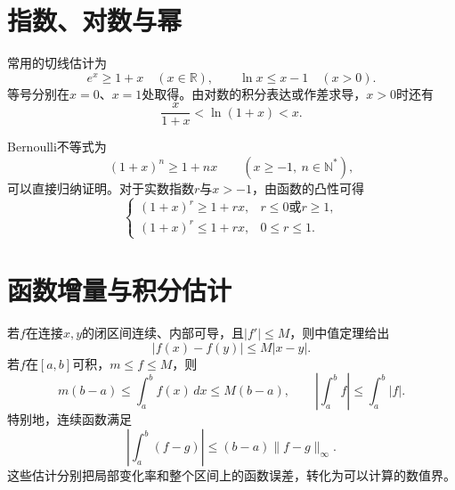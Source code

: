 \section{指数、对数与幂}

常用的切线估计为
\begin{equation*}
 e^x\ge1+x\quad(x\in\mathbb R),\qquad
 \ln x\le x-1\quad(x>0).
\end{equation*}
等号分别在\(x=0\)、\(x=1\)处取得。由对数的积分表达或作差求导，\(x>0\)时还有
\begin{equation*}
 \frac{x}{1+x}<\ln(1+x)<x.
\end{equation*}

Bernoulli不等式为
\begin{equation*}
 (1+x)^n\ge1+nx\qquad(x\ge-1,\ n\in\mathbb N^*),
\end{equation*}
可以直接归纳证明。对于实数指数\(r\)与\(x>-1\)，由函数的凸性可得
\begin{equation*}
 \begin{cases}
 (1+x)^r\ge1+rx,&r\le0\text{或}r\ge1,\\
 (1+x)^r\le1+rx,&0\le r\le1.
 \end{cases}
\end{equation*}

\section{函数增量与积分估计}

若\(f\)在连接\(x,y\)的闭区间连续、内部可导，且\(|f'|\le M\)，则中值定理给出
\begin{equation*}
 |f(x)-f(y)|\le M|x-y|.
\end{equation*}
若\(f\)在\([a,b]\)可积，\(m\le f\le M\)，则
\begin{equation*}
 m(b-a)\le\int_a^bf(x)\,dx\le M(b-a),\qquad
 \left|\int_a^bf\right|\le\int_a^b|f|.
\end{equation*}
特别地，连续函数满足
\begin{equation*}
 \left|\int_a^b(f-g)\right|\le(b-a)\|f-g\|_\infty.
\end{equation*}
这些估计分别把局部变化率和整个区间上的函数误差，转化为可以计算的数值界。
